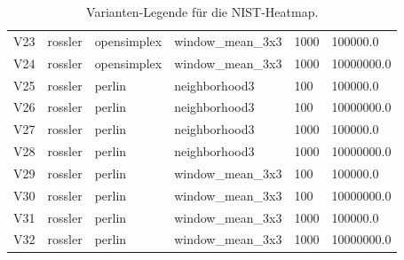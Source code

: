\begin{table}[htbp]
\begin{tabular}{llllll}
    V23 & rossler & opensimplex & window_mean_3x3 & 1000 & 100000.0 \\
    V24 & rossler & opensimplex & window_mean_3x3 & 1000 & 10000000.0 \\
    V25 & rossler & perlin & neighborhood3 & 100 & 100000.0 \\
    V26 & rossler & perlin & neighborhood3 & 100 & 10000000.0 \\
    V27 & rossler & perlin & neighborhood3 & 1000 & 100000.0 \\
    V28 & rossler & perlin & neighborhood3 & 1000 & 10000000.0 \\
    V29 & rossler & perlin & window_mean_3x3 & 100 & 100000.0 \\
    V30 & rossler & perlin & window_mean_3x3 & 100 & 10000000.0 \\
    V31 & rossler & perlin & window_mean_3x3 & 1000 & 100000.0 \\
    V32 & rossler & perlin & window_mean_3x3 & 1000 & 10000000.0 \\
    \hline
  \end{tabular}
  \caption{Varianten-Legende für die NIST-Heatmap.}
  \label{tab:sec:nist-variant-legend}
\end{table}